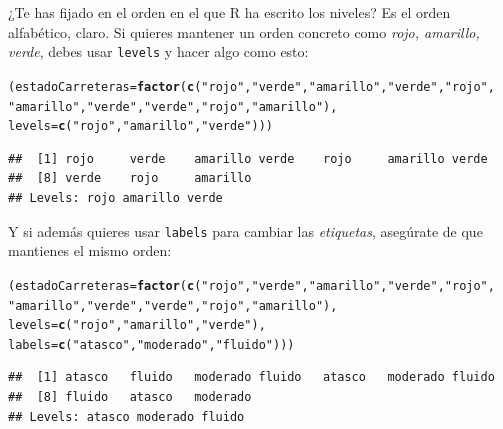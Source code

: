\documentclass[10pt,a4paper]{article}\usepackage[]{graphicx}\usepackage[]{color}
\makeatletter
\newcommand{\hlstr}[1]{\textcolor[rgb]{0.192,0.494,0.8}{#1}}%
\newcommand{\hlstd}[1]{\textcolor[rgb]{0.345,0.345,0.345}{#1}}%
\newcommand{\hlkwb}[1]{\textcolor[rgb]{0.69,0.353,0.396}{#1}}%
\newcommand{\hlkwc}[1]{\textcolor[rgb]{0.333,0.667,0.333}{#1}}%
\newcommand{\hlkwd}[1]{\textcolor[rgb]{0.737,0.353,0.396}{\textbf{#1}}}%
\newenvironment{kframe}{%
 \def\at@end@of@kframe{}%
 \ifinner\ifhmode%
  \def\at@end@of@kframe{\end{minipage}}%
  \begin{minipage}{\columnwidth}%
 \fi\fi%
 \def\FrameCommand##1{\hskip\@totalleftmargin \hskip-\fboxsep
 \colorbox{shadecolor}{##1}\hskip-\fboxsep
     \hskip-\linewidth \hskip-\@totalleftmargin \hskip\columnwidth}%
 \MakeFramed {\advance\hsize-\width
   \@totalleftmargin\z@ \linewidth\hsize
   \@setminipage}}%
 {\par\unskip\endMakeFramed%
 \at@end@of@kframe}
\newenvironment{knitrout}{}{} %
\makeatother
\begin{document}
¿Te has fijado en el orden en el que R ha escrito los niveles? Es el orden alfabético, claro. Si quieres mantener un orden concreto como {\em rojo, amarillo, verde}, debes usar {\tt levels} y hacer algo como esto:

\begin{knitrout}
\color{fgcolor}\begin{kframe}
\begin{alltt}
\hlstd{(estadoCarreteras} \hlkwb{=} \hlkwd{factor}\hlstd{(}\hlkwd{c}\hlstd{(}\hlstr{"rojo"}\hlstd{,} \hlstr{"verde"}\hlstd{,} \hlstr{"amarillo"}\hlstd{,} \hlstr{"verde"}\hlstd{,} \hlstr{"rojo"}\hlstd{,}
    \hlstr{"amarillo"}\hlstd{,} \hlstr{"verde"}\hlstd{,} \hlstr{"verde"}\hlstd{,} \hlstr{"rojo"}\hlstd{,} \hlstr{"amarillo"}\hlstd{),}
    \hlkwc{levels} \hlstd{=} \hlkwd{c}\hlstd{(}\hlstr{"rojo"}\hlstd{,} \hlstr{"amarillo"}\hlstd{,} \hlstr{"verde"}\hlstd{)))}
\end{alltt}
\begin{verbatim}
##  [1] rojo     verde    amarillo verde    rojo     amarillo verde   
##  [8] verde    rojo     amarillo
## Levels: rojo amarillo verde
\end{verbatim}
\end{kframe}
\end{knitrout}

Y si además quieres usar {\tt labels} para cambiar las {\em etiquetas}, asegúrate de que mantienes el mismo orden:


\begin{knitrout}
\color{fgcolor}\begin{kframe}
\begin{alltt}
\hlstd{(estadoCarreteras} \hlkwb{=} \hlkwd{factor}\hlstd{(}\hlkwd{c}\hlstd{(}\hlstr{"rojo"}\hlstd{,} \hlstr{"verde"}\hlstd{,} \hlstr{"amarillo"}\hlstd{,} \hlstr{"verde"}\hlstd{,} \hlstr{"rojo"}\hlstd{,}
    \hlstr{"amarillo"}\hlstd{,} \hlstr{"verde"}\hlstd{,} \hlstr{"verde"}\hlstd{,} \hlstr{"rojo"}\hlstd{,} \hlstr{"amarillo"}\hlstd{),}
    \hlkwc{levels} \hlstd{=} \hlkwd{c}\hlstd{(}\hlstr{"rojo"}\hlstd{,} \hlstr{"amarillo"}\hlstd{,} \hlstr{"verde"}\hlstd{),}
    \hlkwc{labels} \hlstd{=} \hlkwd{c}\hlstd{(}\hlstr{"atasco"}\hlstd{,} \hlstr{"moderado"}\hlstd{,} \hlstr{"fluido"}\hlstd{)))}
\end{alltt}
\begin{verbatim}
##  [1] atasco   fluido   moderado fluido   atasco   moderado fluido  
##  [8] fluido   atasco   moderado
## Levels: atasco moderado fluido
\end{verbatim}
\end{kframe}
\end{knitrout}
\end{document}

